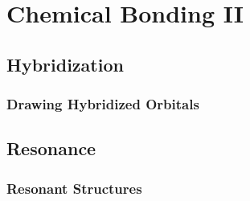 \documentclass[../main]{subfiles}
\begin{document}
\section{Chemical Bonding II}

\subsection{Hybridization}

\subsubsection{Drawing Hybridized Orbitals}

\subsection{Resonance}

\subsubsection{Resonant Structures}
\end{document}
